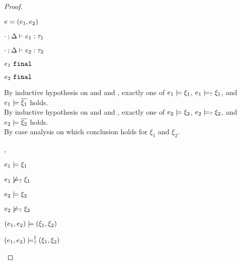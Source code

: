\begin{proof}
\begin{byCases}
\begin{byCases}
\begin{byCases}
        \end{byCases}
    \item[\text{(\ref{rule:TPair})}]
        \begin{pfsteps*}
        \item $e=(e_1 , e_2)$ 
        \item $\cdot \mathbin{;} \Delta \vdash e_1 : \tau_1$  
        \item $\cdot \mathbin{;} \Delta \vdash e_2 : \tau_2$  
        \item $e_1 ~\mathtt{final}$  
        \item $e_2 ~\mathtt{final}$  
        \end{pfsteps*}
        By inductive hypothesis on  and  and , exactly one of $e_1 \models \xi_1$, $e_1 \models_{?} \xi_1$, and $e_1 \models \overline{\xi_1}$ holds. \\
        By inductive hypothesis on  and  and , exactly one of $e_2 \models \xi_2$, $e_2 \models_{?} \xi_2$, and $e_2 \models \overline{\xi_2}$ holds. \\
        By case analysis on which conclusion holds for $\xi_1$ and $\xi_2$.
        \begin{byCases}
        \item[\csatisfy{e_1}{\xi_1},\csatisfy{e_2}{\xi_2}]
            \begin{pfsteps*}
            \item $e_1 \models \xi_1$  
            \item $e_1 \not\models_{?} \xi_1$  
            \item $e_2 \models \xi_2$  
            \item $e_2 \not\models_{?} \xi_2$  
            \item $(e_1 , e_2) \models (\xi_1 , \xi_2)$  
            \item $(e_1 , e_2) \models_{?}^{\dag} (\xi_1 , \xi_2)$ 

\end{pfsteps*}
\end{byCases}
\end{byCases}
\end{byCases}
\end{proof}
